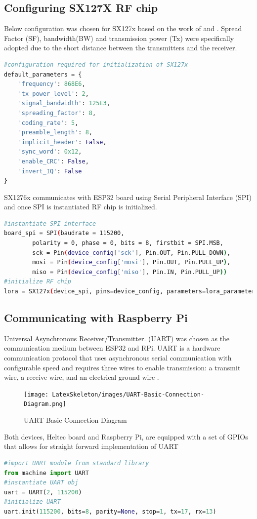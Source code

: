 \documentclass[oneside,12pt]{book}
\begin{document}
\subsection{Configuring SX127X RF chip}
Below configuration was chosen for SX127x  based on the work of \cite{8758033} and \cite{Kurji2021}. Spread Factor (SF), bandwidth(BW) and transmission power (Tx) were specifically adopted due to the short distance between the transmitters and the receiver.
\begin{lstlisting}[language=Python, caption=SX127X configuration,captionpos=b]
#configuration required for initialization of SX127x
default_parameters = {
    'frequency': 868E6, 
    'tx_power_level': 2, 
    'signal_bandwidth': 125E3,    
    'spreading_factor': 8, 
    'coding_rate': 5, 
    'preamble_length': 8,
    'implicit_header': False, 
    'sync_word': 0x12, 
    'enable_CRC': False,
    'invert_IQ': False
}
\end{lstlisting}
SX1276x communicates with ESP32 board using Serial Peripheral Interface (SPI) and once SPI is instantiated RF chip is initialized.
\begin{lstlisting}[language=Bash, caption=SPI interface initialization,captionpos=b]
#instantiate SPI interface
board_spi = SPI(baudrate = 115200, 
        polarity = 0, phase = 0, bits = 8, firstbit = SPI.MSB,
        sck = Pin(device_config['sck'], Pin.OUT, Pin.PULL_DOWN),
        mosi = Pin(device_config['mosi'], Pin.OUT, Pin.PULL_UP),
        miso = Pin(device_config['miso'], Pin.IN, Pin.PULL_UP))
#initialize RF chip
lora = SX127x(device_spi, pins=device_config, parameters=lora_parameters)
\end{lstlisting}
\subsection{Communicating with Raspberry Pi}
Universal Asynchronous Receiver/Transmitter. (UART) was chosen as the communication medium between ESP32 and RPi. UART is a hardware communication protocol that uses asynchronous serial communication with configurable speed and requires three wires to enable transmission: a transmit wire, a receive wire, and an electrical ground wire \citep{Embedded}.
\begin{figure}[H]
\centering
\texttt{[image: LatexSkeleton/images/UART-Basic-Connection-Diagram.png]}
\caption{UART Basic Connection Diagram}\citep{uart}
\end{figure}
\noindent Both devices, Heltec board and Raspberry Pi, are equipped with a set of GPIOs that allows for straight forward implementation of UART
\begin{lstlisting}[language=Python, caption=UART setup - MicroPython,captionpos=b]
#import UART module from standard library
from machine import UART
#instantiate UART obj
uart = UART(2, 115200)
#initialize UART 
uart.init(115200, bits=8, parity=None, stop=1, tx=17, rx=13)
\end{lstlisting}
\end{document}
